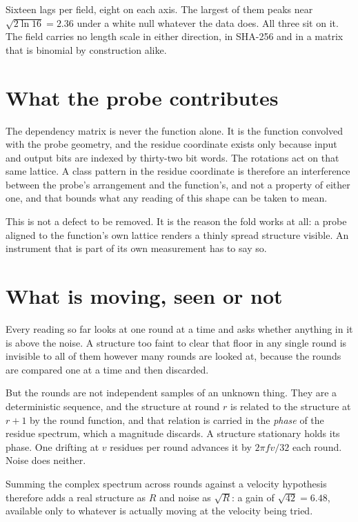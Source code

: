 Sixteen lags per field, eight on each axis. The largest of them peaks near
\(\sqrt{2 \ln 16} = 2.36\) under a white null whatever the data does. All three sit on it. The
field carries no length scale in either direction, in SHA-256 and in a matrix that is binomial by
construction alike.

\section{What the probe contributes}

The dependency matrix is never the function alone. It is the function convolved with the probe
geometry, and the residue coordinate exists only because input and output bits are indexed by
thirty-two bit words. The rotations act on that same lattice. A class pattern in the residue
coordinate is therefore an interference between the probe's arrangement and the function's, and not
a property of either one, and that bounds what any reading of this shape can be taken to mean.

This is not a defect to be removed. It is the reason the fold works at all: a probe aligned to the
function's own lattice renders a thinly spread structure visible. An instrument that is part of its
own measurement has to say so.

\section{What is moving, seen or not}

Every reading so far looks at one round at a time and asks whether anything in it is above
the noise. A structure too faint to clear that floor in any single round is invisible to all of
them however many rounds are looked at, because the rounds are compared one at a time and then
discarded.

But the rounds are not independent samples of an unknown thing. They are a deterministic sequence,
and the structure at round \(r\) is related to the structure at \(r+1\) by the round function, and
that relation is carried in the \emph{phase} of the residue spectrum, which a magnitude discards. A
structure stationary holds its phase. One drifting at \(v\) residues per round advances it by
\(2\pi f v / 32\) each round. Noise does neither.

Summing the complex spectrum across rounds against a velocity hypothesis therefore adds a real
structure as \(R\) and noise as \(\sqrt{R}\): a gain of \(\sqrt{42} = 6.48\), available only to
whatever is actually moving at the velocity being tried.

